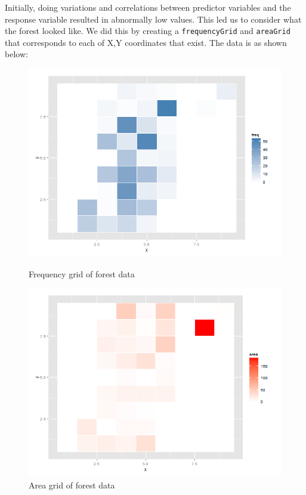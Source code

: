 \documentclass{article}
\begin{document}
Initially, doing variations and correlations between predictor variables and the response
variable resulted in abnormally low values. This led us to consider what the forest looked like.
We did this by creating a \verb+frequencyGrid+ and \verb+areaGrid+ that corresponds to each
of X,Y coordinates that exist. The data is as shown below:

\begin{figure}
  \begin{minipage}[b]{0.475\linewidth}
  \centering
  \includegraphics[width=\textwidth]{figures/freq.png}
  \caption{Frequency grid of forest data}
\end{minipage}
\hspace{0.5cm}
  \begin{minipage}[b]{0.475\linewidth}
  \centering
  \includegraphics[width=\textwidth]{figures/area.png}
  \caption{Area grid of forest data}
\end{minipage}
\end{figure}
\end{document}
